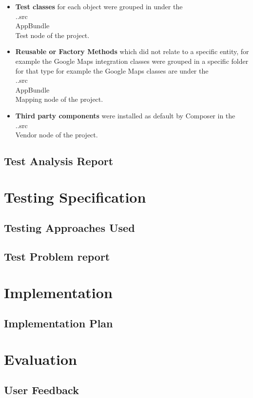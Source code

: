 \documentclass[a4paper,12pt]{article}
\begin{document}
\begin {itemize}
\item \textbf{Test classes} for each object were grouped in under the \\..src\\AppBundle\\Test node of the project.  
\item \textbf{Reusable or Factory Methods} which did not relate to a specific entity, for example the Google Maps integration classes were grouped in a specific folder for that type for example the Google Maps classes are under the \\..src\\AppBundle\\Mapping node of the project.  
\item \textbf{Third party components} were installed as default by Composer in the \\..src\\Vendor node of the project.  
\end {itemize}

\subsection {Test Analysis Report}

\section {Testing Specification}
\subsection {Testing Approaches Used}
\subsection {Test Problem report}
\section {Implementation}
\subsection {Implementation Plan}
\section {Evaluation}
\subsection {User Feedback}
\end{document}
